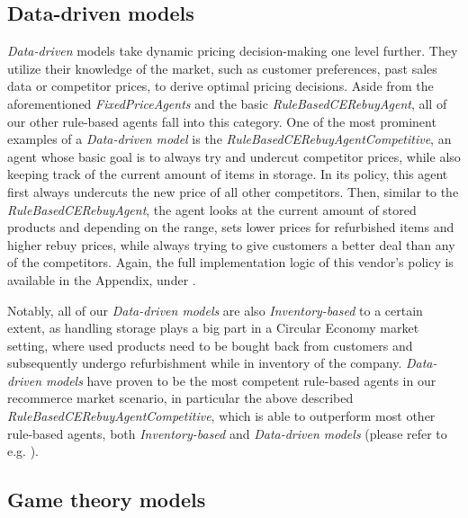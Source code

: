 \subsection{Data-driven models}\label{subsec:DataDrivenModels}

\emph{Data-driven} models take dynamic pricing decision-making one level further. They utilize their knowledge of the market, such as customer preferences, past sales data or competitor prices, to derive optimal pricing decisions. Aside from the aforementioned \emph{FixedPriceAgents} and the basic \emph{RuleBasedCERebuyAgent}, all of our other rule-based agents fall into this category. One of the most prominent examples of a \emph{Data-driven model} is the \emph{RuleBasedCERebuyAgentCompetitive}, an agent whose basic goal is to always try and undercut competitor prices, while also keeping track of the current amount of items in storage. In its policy, this agent first always undercuts the new price of all other competitors. Then, similar to the \emph{RuleBasedCERebuyAgent}, the agent looks at the current amount of stored products and depending on the range, sets lower prices for refurbished items and higher rebuy prices, while always trying to give customers a better deal than any of the competitors. Again, the full implementation logic of this vendor's policy is available in the Appendix, under .

Notably, all of our \emph{Data-driven models} are also \emph{Inventory-based} to a certain extent, as handling storage plays a big part in a Circular Economy market setting, where used products need to be bought back from customers and subsequently undergo refurbishment while in inventory of the company. \emph{Data-driven models} have proven to be the most competent rule-based agents in our recommerce market scenario, in particular the above described \emph{RuleBasedCERebuyAgentCompetitive}, which is able to outperform most other rule-based agents, both \emph{Inventory-based} and \emph{Data-driven models} (please refer to e.g. ).

\subsection{Game theory models}\label{subsec:GameTheory}

